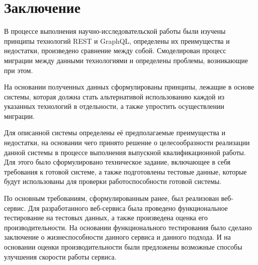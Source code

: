 \chapter*{Заключение} \label{ch-conclusion}

В процессе выполнения научно-исследовательской работы были изучены принципы технологий REST и GraphQL, определены их преимущества и недостатки, произведено сравнение между собой.
Смоделирован процесс миграции между данными технологиями и определены проблемы, возникающие при этом.

На основании полученных данных сформулированы принципы, лежащие в основе системы, которая должна стать альтернативой использованию каждой из указанных технологий в отдельности, а также упростить осуществлении миграции.

Для описанной системы определены её предполагаемые преимущества и недостатки, на основании чего принято решение о целесообразности реализации данной системы в процессе выполнения выпускной квалификационной работы.
Для этого было сформулировано техническое задание, включающее в себя требования к готовой системе, а также подготовлены тестовые данные, которые будут использованы для проверки работоспособности готовой системы.

По основным требованиям, сформулированным ранее, был реализован веб-сервис.
Для разработанного веб-сервиса была проведено функциональное тестирование на тестовых данных, а также произведена оценка его производительности. %
На основании функционального тестирования было сделано заключение о жизнеспособности данного сервиса и данного подхода.
И на основании оценки производительности были предложены возможные способы улучшения скорости работы сервиса.

